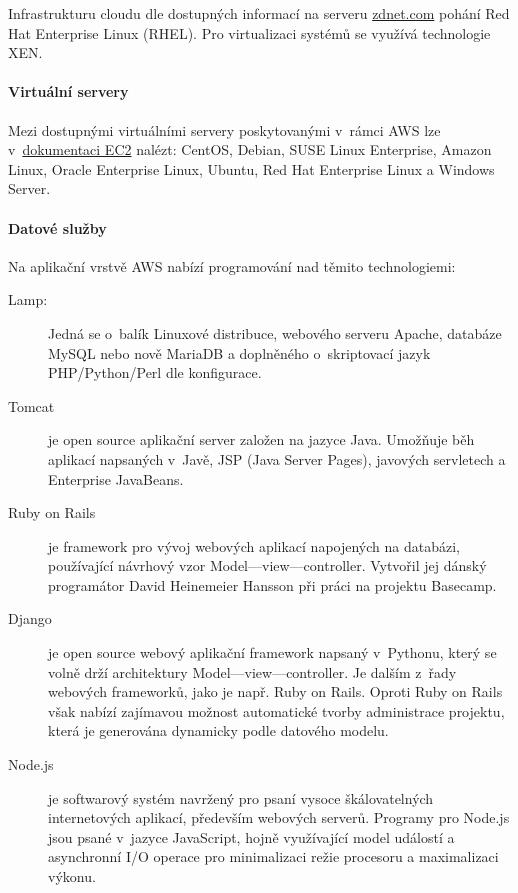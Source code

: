 Infrastrukturu cloudu dle dostupných informací na serveru \href{http://www.zdnet.com/blog/open-source/amazon-ec2-cloud-is-made-up-of-almost-half-a-million-linux-servers/10620}{zdnet.com\cite{zdnet:amazonLinux}} pohání Red Hat Enterprise Linux (RHEL). Pro virtualizaci systémů se využívá technologie XEN.

\paragraph{Virtuální servery}
Mezi dostupnými virtuálními servery poskytovanými v~rámci AWS lze v~\href{http://aws.amazon.com/ec2/details/}{dokumentaci EC2\cite{amazon:ec2Details}} nalézt: CentOS, Debian, SUSE Linux Enterprise, Amazon Linux, Oracle Enterprise Linux, Ubuntu, Red Hat Enterprise Linux a Windows Server.

\paragraph{Datové služby}
Na aplikační vrstvě AWS nabízí programování nad těmito technologiemi:
\begin{description}
	\item [Lamp:] Jedná se o~balík Linuxové distribuce, webového serveru Apache, databáze MySQL nebo nově MariaDB a doplněného o~skriptovací jazyk PHP/Python/Perl dle konfigurace.
	\item [Tomcat] je open source aplikační server založen na jazyce Java. Umožňuje běh aplikací napsaných v~Javě, JSP (Java Server Pages), javových servletech a Enterprise JavaBeans.
	\item [Ruby on Rails] je framework pro vývoj webových aplikací napojených na databázi, používající návrhový vzor Model---view---controller. Vytvořil jej dánský programátor David Heinemeier Hansson při práci na projektu Basecamp.\cite{wiki:rails}
	\item [Django] je open source webový aplikační framework napsaný v~Pythonu, který se volně drží architektury Model---view---controller. Je dalším z~řady webových frameworků, jako je např. Ruby on Rails. Oproti Ruby on Rails však nabízí zajímavou možnost automatické tvorby administrace projektu, která je generována dynamicky podle datového modelu.\cite{wiki:django}
	\item [Node.js] je softwarový systém navržený pro psaní vysoce škálovatelných internetových aplikací, především webových serverů. Programy pro Node.js jsou psané v~jazyce JavaScript, hojně využívající model událostí a asynchronní I/O operace pro minimalizaci režie procesoru a maximalizaci výkonu.\cite{wiki:node.js}
\end{description}

